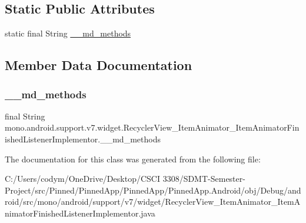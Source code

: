 \subsection*{Static Public Attributes}
\begin{DoxyCompactItemize}
\item 
static final String \hyperlink{classmono_1_1android_1_1support_1_1v7_1_1widget_1_1_recycler_view___item_animator___item_animator_finished_listener_implementor_ab61d1754d9a39a88b3accee404008012}{\+\_\+\+\_\+md\+\_\+methods}
\end{DoxyCompactItemize}


\subsection{Member Data Documentation}
\mbox{\label{classmono_1_1android_1_1support_1_1v7_1_1widget_1_1_recycler_view___item_animator___item_animator_finished_listener_implementor_ab61d1754d9a39a88b3accee404008012}} 
\subsubsection{\texorpdfstring{\+\_\+\+\_\+md\+\_\+methods}{\_\_md\_methods}}
{\footnotesize\ttfamily final String mono.\+android.\+support.\+v7.\+widget.\+Recycler\+View\+\_\+\+Item\+Animator\+\_\+\+Item\+Animator\+Finished\+Listener\+Implementor.\+\_\+\+\_\+md\+\_\+methods\hspace{0.3cm}{\ttfamily [static]}}



The documentation for this class was generated from the following file\+:\begin{DoxyCompactItemize}
\item 
C\+:/\+Users/codym/\+One\+Drive/\+Desktop/\+C\+S\+C\+I 3308/\+S\+D\+M\+T-\/\+Semester-\/\+Project/src/\+Pinned/\+Pinned\+App/\+Pinned\+App/\+Pinned\+App.\+Android/obj/\+Debug/android/src/mono/android/support/v7/widget/Recycler\+View\+\_\+\+Item\+Animator\+\_\+\+Item\+Animator\+Finished\+Listener\+Implementor.\+java\end{DoxyCompactItemize}
